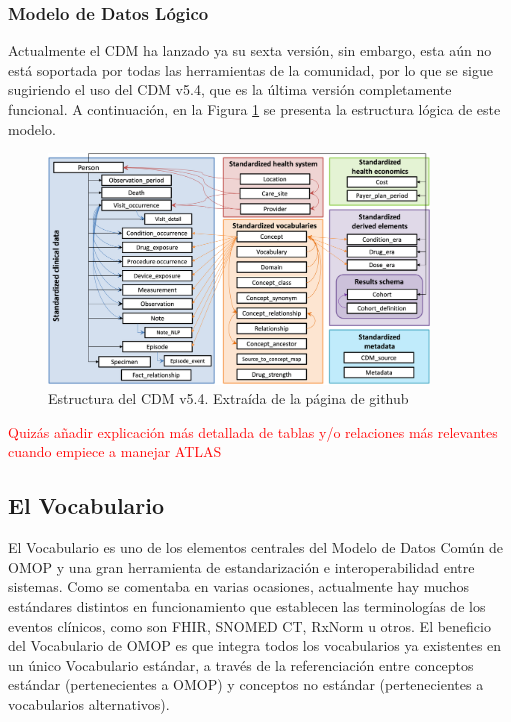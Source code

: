 \subsubsection{Modelo de Datos Lógico}

Actualmente el CDM ha lanzado ya su sexta versión, sin embargo, esta aún no está soportada por todas las herramientas de la comunidad, por lo que se sigue sugiriendo el uso del CDM v5.4, que es la última versión completamente funcional. A continuación, en la Figura \ref{fig:cdm54} se presenta la estructura lógica de este modelo.

\begin{figure}[H]
    \centering
    \includegraphics[width=0.90\textwidth]{figures/cdm54.png}
     \caption{Estructura del CDM v5.4. Extraída de la página de github \cite{gitPagesCMD}}
    \label{fig:cdm54}
\end{figure}

\textcolor{red}{Quizás añadir explicación más detallada de tablas y/o relaciones más relevantes cuando empiece a manejar ATLAS}

\subsection{El Vocabulario}\label{subsec:05vocab}

El Vocabulario es uno de los elementos centrales del Modelo de Datos Común de OMOP y una gran herramienta de estandarización e interoperabilidad entre sistemas. Como se comentaba en varias ocasiones, actualmente hay muchos estándares distintos en funcionamiento que establecen las terminologías de los eventos clínicos, como son FHIR, SNOMED CT, RxNorm u otros. El beneficio del Vocabulario de OMOP es que integra todos los vocabularios ya existentes en un único Vocabulario estándar, a través de la referenciación entre conceptos estándar (pertenecientes a OMOP) y conceptos no estándar (pertenecientes a vocabularios alternativos).

